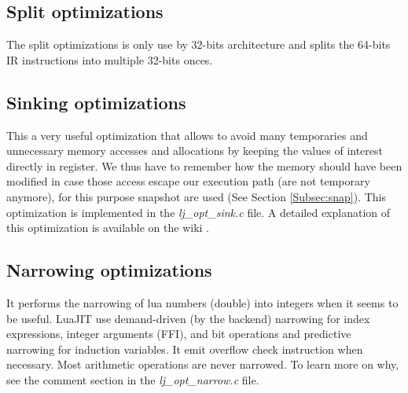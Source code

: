 
\subsection{Split optimizations}
\label{Subsec:opt-split}

The split optimizations is only use by 32-bits architecture and splits the
64-bits IR instructions into multiple 32-bits onces.


\subsection{Sinking optimizations}
\label{Subsec:opt-sinking}
This a very useful optimization that allows to avoid many temporaries and
unnecessary memory accesses and allocations by keeping the values of interest
directly in register. We thus have to remember how the memory should have been
modified in case those access escape our execution path (are not temporary
anymore), for this purpose snapshot are used (See Section \ref{Subsec:snap}).
This optimization is implemented in the \emph{lj\_opt\_sink.c} file. A detailed
explanation of this optimization is available on the wiki \cite{luajit-sink}.


\subsection{Narrowing optimizations}
\label{Subsec:narrowing}

It performs the narrowing of lua numbers (double) into integers when it seems
to be useful. LuaJIT use demand-driven (by the backend) narrowing for index
expressions, integer arguments (FFI), and bit operations and predictive
narrowing for induction variables. It emit overflow check instruction when
necessary. Most arithmetic operations are never narrowed. To learn more on why,
see the comment section in the \emph{lj\_opt\_narrow.c} file.

